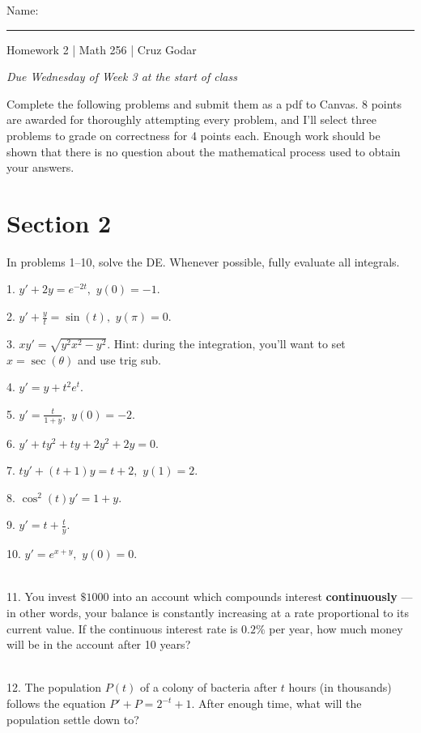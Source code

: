\documentclass{article}
\begin{document}
\Large Name: \rule{2in}{0.15mm} \hfill Homework 2 | Math 256 | Cruz Godar \vspace{4pt} \normalsize

\textit{Due Wednesday of Week 3 at the start of class}

Complete the following problems and submit them as a pdf to Canvas. 8 points are awarded for thoroughly attempting every problem, and I'll select three problems to grade on correctness for 4 points each. Enough work should be shown that there is no question about the mathematical process used to obtain your answers.

\section{Section 2}

In problems 1--10, solve the DE. Whenever possible, fully evaluate all integrals.

1. $\displaystyle y' + 2y = e^{-2t},$ $\displaystyle y(0) = -1.$

2. $\displaystyle y' + \frac{y}{t} = \sin(t),$ $\displaystyle y(\pi) = 0.$

3. $\displaystyle xy' = \sqrt{y^2x^2 - y^2}.$ Hint: during the integration, you'll want to set $x = \sec(\theta)$ and use trig sub.

4. $\displaystyle y' = y + t^2e^t.$

5. $\displaystyle y' = \frac{t}{1 + y},$ $\displaystyle y(0) = -2.$

6. $\displaystyle y' + ty^2 + ty + 2y^2 + 2y = 0.$

7. $\displaystyle ty' + (t + 1)y = t + 2,$ $\displaystyle y(1) = 2.$

8. $\displaystyle \cos^2(t)y' = 1 + y.$

9. $\displaystyle y' = t + \frac{t}{y}.$

10. $\displaystyle y' = e^{x + y},$ $\displaystyle y(0) = 0.$

~\\

11. You invest $\$1000$ into an account which compounds interest \textbf{continuously} --- in other words, your balance is constantly increasing at a rate proportional to its current value. If the continuous interest rate is $0.2\%$ per year, how much money will be in the account after 10 years?

~\\

12. The population $P(t)$ of a colony of bacteria after $t$ hours (in thousands) follows the equation $\displaystyle P' + P = 2^{-t} + 1.$ After enough time, what will the population settle down to?
\end{document}

